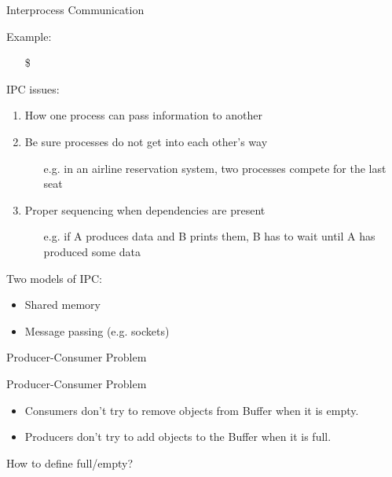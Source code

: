\begin{frame}{Interprocess Communication}
  \begin{block}{Example:}
    \begin{itemize}
    \item[\$] 
    \end{itemize}
  \end{block}
  \begin{block}{IPC issues:}
    \begin{enumerate}
    \item How one process can pass information to another
    \item Be sure processes do not get into each other's way
      \begin{itemize}
      \item[e.g.] in an airline reservation system, two processes compete for the last
        seat
      \end{itemize}
    \item Proper sequencing when dependencies are present
      \begin{itemize}
      \item[e.g.] if A produces data and B prints them, B has to wait until A has produced
        some data
      \end{itemize}
    \end{enumerate}
  \end{block}
  \begin{block}{Two models of IPC:}
    \begin{itemize}
    \item Shared memory
    \item Message passing (e.g. sockets)
    \end{itemize}
  \end{block}
\end{frame}

\begin{frame}{Producer-Consumer Problem}
\begin{center}
\end{center}
\end{frame}

\begin{frame}{Producer-Consumer Problem}
  \begin{itemize}
  \item Consumers don't try to remove objects from Buffer when it is empty.
  \item Producers don't try to add objects to the Buffer when it is full.
  \end{itemize}
  \begin{center}
  \end{center}
  \begin{center}
    How to define \alert{full/empty}?
  \end{center}
\end{frame}

